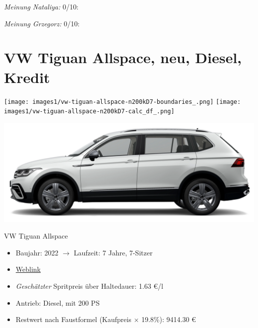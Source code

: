 \documentclass[landscape, DIV=99, 14pt]{scrartcl}
\begin{document}
\begin{small}
\emph{Meinung Nataliya:} 0/10: 
        
\emph{Meinung Grzegorz:} 0/10: 
\end{small}

\pagebreak


\twocolumn

\section*{VW Tiguan Allspace, neu, Diesel, Kredit}
\begin{center}
\texttt{[image: images1/vw-tiguan-allspace-n200kD7-boundaries\_.png]}
\null
\vspace{0.5cm}
\texttt{[image: images1/vw-tiguan-allspace-n200kD7-calc\_df\_.png]}
\end{center}

\pagebreak
\begin{center}
\includegraphics[width=0.9\columnwidth]{cars/vw-tiguan-diesel.png}

VW Tiguan Allspace
\end{center}

\begin{itemize}
    \item Baujahr: 2022 $\rightarrow$ Laufzeit: 7 Jahre, 7-Sitzer
    \item \href{https://www.volkswagen.de/de/konfigurator.html/__app/der-neue-tiguan-allspace/der-tiguan-allspace---standardmodelle/elegance.app?buildabilityStatus-app=buildable&category-app=private&carlineId-app=31160&salesGroupId-app=32700&trimName-app=Elegance&modelId-app=BJ247T%24GYORYOR&modelVersion-app=2&modelYear-app=2022&exteriorId-app=F14+0Q0Q&interiorId-app=F56+++++BG&options-app=GWBAWBA-GPG4PG4-MAHV1M6-GPFCPFC-GRBDRBD-MKSUKA2}{Weblink}
    \item \emph{Gesch\"atzter} Spritpreis \"uber Haltedauer: 1.63 \euro{}/l
    \item Antrieb: Diesel, mit 200 PS
    \item Restwert nach Faustformel (Kaufpreis $\times$ 19.8\%): 9414.30 \euro{}
\end{itemize}
\end{document}
